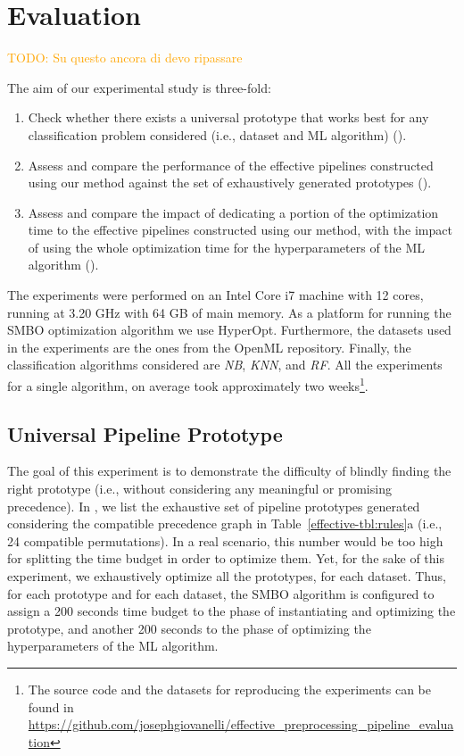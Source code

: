 \section{Evaluation}
\label{effective-sec:evaluation}

\textcolor{orange}{TODO: Su questo ancora di devo ripassare}

The aim of our experimental study is three-fold:
\begin{enumerate}
    \item Check whether there exists a universal prototype that works best for any classification problem considered  (i.e., dataset and ML algorithm) ().
    \item Assess and compare the performance of the effective pipelines constructed using our method against the set of exhaustively generated prototypes ().
    \item Assess and compare the impact of dedicating a portion of the optimization time to the effective pipelines constructed using our method, with the impact of using the whole optimization time for the hyperparameters of the ML algorithm ().
\end{enumerate}

The experiments were performed on an Intel Core i7 machine with 12 cores, running at 3.20 GHz with 64 GB of main memory. As a platform for running the SMBO optimization algorithm we use HyperOpt. Furthermore, the datasets used in the experiments are the ones from the OpenML repository. Finally, the classification algorithms considered are \textit{NB}, \textit{KNN}, and \textit{RF}. All the experiments for a single algorithm, on average took approximately two weeks\footnote{The source code and the datasets for reproducing the experiments can be found in
\href{https://github.com/josephgiovanelli/effective\_preprocessing\_pipeline\_evaluation}{https://github.com/josephgiovanelli/effective\_preprocessing\_pipeline\_evaluation}}.

\subsection{Universal Pipeline Prototype}
\label{effective-sec:eval-universal-pipeline}
The goal of this experiment is to demonstrate the difficulty of blindly finding the right prototype (i.e., without considering any meaningful or promising precedence).
In , we list the exhaustive set of pipeline prototypes generated considering the compatible precedence graph in Table~\ref{effective-tbl:rules}a (i.e., 24 compatible permutations).
In a real scenario, this number would be too high for splitting the time budget in order to optimize them.
Yet, for the sake of this experiment, we exhaustively optimize all the prototypes, for each dataset.
Thus, for each prototype and for each dataset, the SMBO algorithm is configured to assign a 200 seconds time budget to the phase of instantiating and optimizing the prototype, and another 200 seconds to the phase of optimizing the hyperparameters of the ML algorithm.

